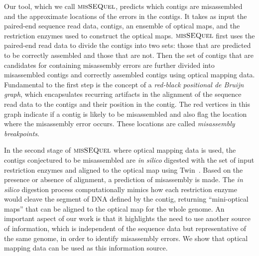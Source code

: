 Our tool, which we call $\mbox{\rm {\sc misSEQuel}}$, predicts which contigs are misassembled and the approximate locations of the errors in the contigs.  It takes as input the paired-end sequence read data, contigs, an ensemble of optical maps, and the restriction enzymes used to construct the optical maps.
$\mbox{\rm {\sc misSEQuel}}$ first uses the paired-end read data to divide the contigs into two sets: those that are predicted to be correctly assembled and those that are not.  
Then the set of  contigs that are candidates for containing misassembly errors are further divided into misassembled contigs and correctly assembled contigs using optical mapping data.
Fundamental to the first step is the concept of a {\em red-black positional de Bruijn graph}, which encapsulates recurring artifacts in the alignment of the sequence read data to the contigs and their position in the contig. 
The red vertices in this graph indicate if a contig is likely to be misassembled and also flag the location where the misassembly error occurs. These locations are called {\em  misassembly breakpoints}.

In the second stage of $\mbox{\rm {\sc misSEQuel}}$ where optical mapping data is used, the contigs conjectured to be misassembled are {\em in silico} digested with the set of input restriction enzymes and aligned to the optical map using Twin~\cite{wabi2014}.  Based on the presence or absence of alignment, a prediction of misassembly is made.  The {\em in silico} digestion process computationally mimics how each restriction enzyme would cleave the segment of DNA defined by the contig, returning ``mini-optical maps'' that can be aligned to the optical map for the whole genome. An important aspect of our work is that it highlights the need to use another source of information, which is independent of the sequence data but representative of the same genome, in order to identify misassembly errors. We show that optical mapping data can be used as this information source.   
 

